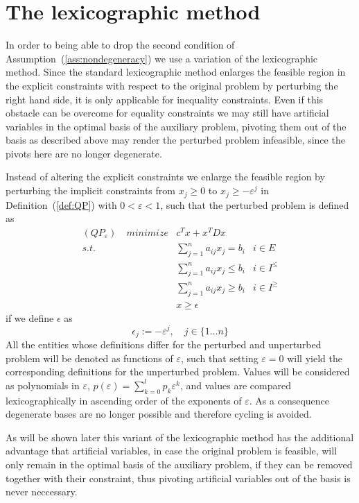 \documentclass[a4paper]{article}
\begin{document}
\section{The lexicographic method}
In order to being able to drop the second condition of
Assumption~(\ref{ass:nondegeneracy}) we use a variation of the lexicographic
method. Since the standard lexicographic method enlarges the feasible region
in the explicit constraints with respect to the original problem by perturbing
the right hand side, it is only applicable for inequality
constraints. Even if this obstacle can be overcome for equality constraints we
may still have artificial variables in the optimal basis of the auxiliary
problem, pivoting them out of the basis as described above may render the
perturbed problem infeasible, since the pivots here are no longer degenerate.

Instead of altering the explicit constraints we enlarge the feasible region by
perturbing the implicit constraints from $x_{j} \geq 0$ to $x_{j} \geq
-\varepsilon^{j}$ in Definition~(\ref{def:QP}) with $0 < \varepsilon < 1$, such
that the perturbed problem is defined as
\begin{eqnarray}
\label{def:QP_eps}
(QP_{\varepsilon})\quad minimize&  c^{T}x + x^{T} D x   & \nonumber \\
s.t.	 & \sum_{j=1}^{n}a_{ij}x_{j} = b_{i}	& i \in E \nonumber \\
	 & \sum_{j=1}^{n}a_{ij}x_{j} \leq b_{i} & i \in I^{\leq} \\
	 & \sum_{j=1}^{n}a_{ij}x_{j} \geq b_{i} & i \in I^{\geq} \nonumber \\
	 & x \geq \epsilon				& \nonumber  
\end{eqnarray}
if we define $\epsilon$ as
\begin{equation}
\label{def:epsilon}
\epsilon_{j}:= -\varepsilon^{j}, \quad j \in \{1 \dots n \}
\end{equation}
All the entities whose definitions differ for the perturbed and
unperturbed problem  will be denoted as functions of $\varepsilon$,
such that setting $\varepsilon =0$ will yield the corresponding definitions
for the unperturbed problem.
Values will be considered as polynomials in $\varepsilon$,
$p(\varepsilon)=\sum_{k=0}^{l}p_{k}\varepsilon^{k}$, and values are compared
lexicographically in ascending order of the exponents of $\varepsilon$. As
a consequence degenerate bases are no longer possible and therefore cycling is
avoided.   

As will be shown later this variant of the lexicographic method has the
additional
advantage that artificial variables,  in case the original problem is feasible,
will only remain in the optimal basis of the
auxiliary problem, if they can be
removed together with their constraint, thus
pivoting artificial variables out of the basis is never neccessary.
  
\end{document}
